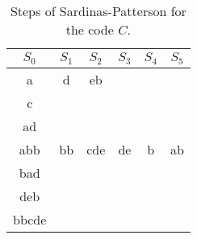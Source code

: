 \documentclass{subfiles}
\begin{document}
    \begin{table}[!hb]
        \centering
        \begin{tabular}{|c|c|c|c|c|c|}
        \hline 
        \(S_{0}\) & \(S_{1}\) & \(S_{2}\) & \(S_{3}\) & \(S_{4}\) & \(S_{5}\) \\ 
        \hline
        a & d & eb & & & \\ 
        c & & & & & \\ 
        ad &  & & & & \\ 
        abb & bb & cde & de & b & ab \\ 
        bad & & & & & \\ 
        deb & & & & & \\ 
        bbcde & & & & & \\ 
        \hline
        \end{tabular}
        \caption{Steps of Sardinas-Patterson for the code \(C\).}
        \label{Tab:1}
    \end{table}    
\end{document}
